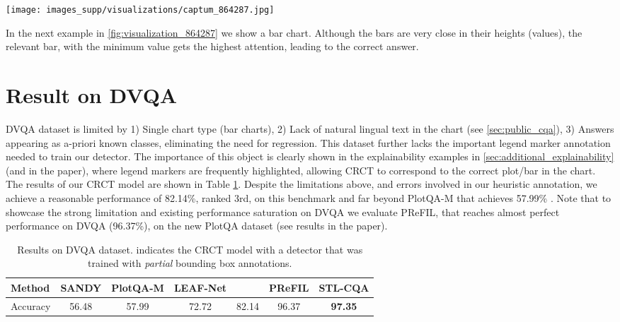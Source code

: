 \documentclass[runningheads]{llncs}
\newcommand\our[1][]{CRCT\xspace}
\begin{document}
\begin{figure*}[ht]
\begin{center}
\texttt{[image: images\_supp/visualizations/captum\_864287.jpg]}
\end{center}
   \caption{Explainability visualizations for a PlotQA test sample. Q: {\it In which year was the persistence rate of female students minimum?}, Ground truth: 1982. \our: \textcolor{ForestGreen}{1982}. For better visibility, we overlay the visualization as colored bounding box around the bars. Note how green bars related to {\it Female} achieve higher attention with the correct bar receiving the highest attention.}
\label{fig:visualization_864287}
\end{figure*}
In the next example in \cref{fig:visualization_864287} we show a bar chart. Although the bars are very close in their heights (values), the relevant bar, with the minimum value gets the highest attention, leading to the correct answer.




\section{Result on DVQA}
DVQA dataset is limited by 1) Single chart type (bar charts), 2) Lack of natural lingual text in the chart (see \cref{sec:public_cqa}), 3) Answers appearing as a-priori known classes, eliminating the need for regression. This dataset further lacks the important legend marker annotation needed to train our detector. The importance of this object is clearly shown in the explainability examples in \cref{sec:additional_explainability} (and in the paper), where legend markers are frequently highlighted, allowing \our to correspond to the correct plot/bar in the chart. The results of our CRCT model are shown in Table \ref{table:dvqa_results}.
Despite the limitations above, and errors involved in our heuristic annotation, we achieve a reasonable performance of 82.14\%, ranked 3rd, on this benchmark and far beyond PlotQA-M that achieves 57.99\% . Note that to showcase the strong limitation and existing performance saturation on DVQA we evaluate PReFIL, that reaches almost perfect performance on DVQA (96.37\%), on the new PlotQA dataset (see results in the paper).
\begin{table}[ht]
\centering
\caption{Results on DVQA dataset.  indicates the \our model with a detector that was trained with {\it partial} bounding box annotations.}
\vspace{5mm}
\begin{tabular}{@{}l|llllll@{}}
\toprule
Method & SANDY\cite{dvqa} & PlotQA-M\cite{plotqa} & LEAF-Net\cite{chaudhry2019leafqa} & ~& PReFIL\cite{prefil} & STL-CQA\cite{chartqa} \\ \midrule
Accuracy & \multicolumn{1}{c}{56.48} & \multicolumn{1}{c}{57.99} & \multicolumn{1}{c}{72.72} & \multicolumn{1}{c}{82.14} & \multicolumn{1}{c}{96.37} & \multicolumn{1}{c}{{\bf 97.35}} \\ \bottomrule
\end{tabular}
\label{table:dvqa_results}
\end{table}
\end{document}
